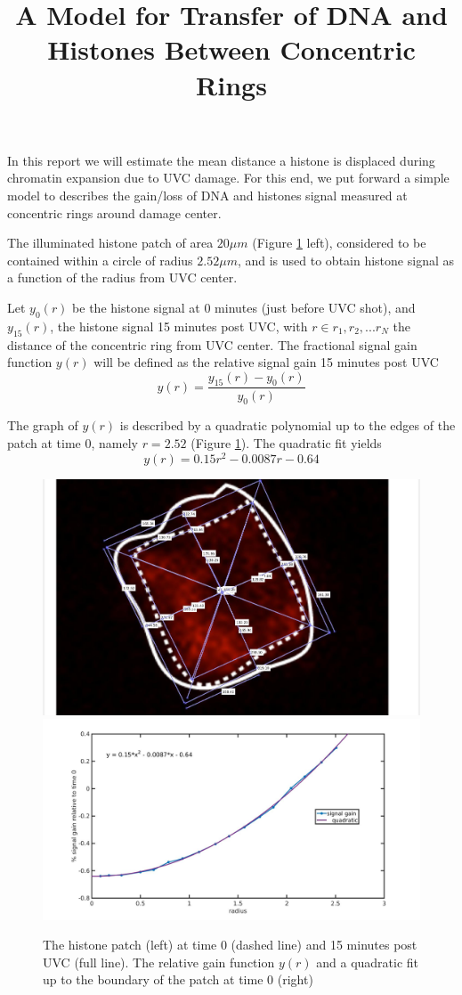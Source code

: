\documentclass[12pt]{report}
\begin{document}
\title{A Model for Transfer of DNA and Histones Between Concentric Rings}
\maketitle
In this report we will estimate the mean distance a histone is displaced during chromatin expansion due to UVC damage.
For this end, we put forward a simple model to describes the gain/loss of DNA and histones signal measured at concentric rings around damage center.

The illuminated histone patch of area $20\mu m$ (Figure \ref{fig:nucleosomeSignalGainConcentricFit} left), considered to be contained within a circle of radius $2.52 \mu m$, and is used to obtain histone signal as a function of the radius from UVC center. 

Let $y_0(r)$ be the histone signal at 0 minutes (just before UVC shot), and $y_{15}(r)$, the histone signal 15 minutes post UVC, with $r\in r_1,r_2,...r_N$ the distance of the concentric ring from UVC center. 
The fractional signal gain function $y(r)$ will be defined as the relative signal gain 15 minutes post UVC
\begin{equation}
y(r) = \frac{y_{15}(r)-y_0(r)}{y_0(r)}
\end{equation}

The graph of $y(r)$ is described by a quadratic polynomial up to the edges of the patch at time 0, namely $r=2.52$  (Figure \ref{fig:nucleosomeSignalGainConcentricFit}). The quadratic fit yields
\begin{equation}
y(r)=0.15r^2-0.0087r-0.64
\end{equation}
 
\begin{figure}[H]
\includegraphics[width=0.5\linewidth,height=0.3\textheight]{../Images/patchExpansion/patchExpansionMeasurement}
\includegraphics[width=0.5\linewidth, height=0.3\textheight]{../Images/patchExpansion/nucleosomeSignalGainConcentricFit}
\caption{The histone patch (left) at time 0 (dashed line) and 15 minutes post UVC (full line). The relative gain function $y(r)$ and a quadratic fit up to the boundary of the patch at time 0 (right)}
\label{fig:nucleosomeSignalGainConcentricFit}
\end{figure}
\end{document}

